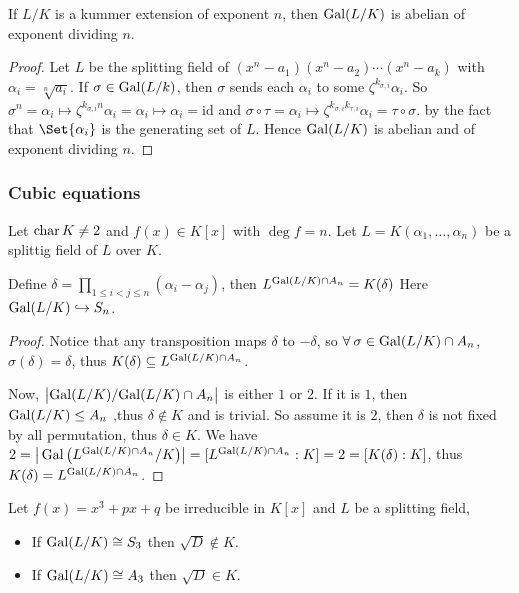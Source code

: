 \begin{theorem}
  If $L/K$ is a kummer extension of exponent $n$, then $\operatorname{Gal}(L/K)$ is abelian of exponent dividing $n$.

  \begin{proof}
    Let $L$ be the splitting field of $(x^n - a_1)(x^n - a_2) \dotsm (x^n - a_k)$ with $\alpha_i = \sqrt[n]{a_i}$.
    If $\sigma \in \operatorname{Gal}(L/k)$, then $\sigma$ sends each $\alpha_i$ to some $\zeta^{k_{\sigma, i}} \alpha_i$.
    So $\sigma^n = \alpha_i \mapsto \zeta^{k_{\sigma, i} n} \alpha_i = \alpha_i \mapsto \alpha_i = \mathrm{id}$
    and $\sigma \circ \tau = \alpha_i \mapsto \zeta^{k_{\sigma, i} k_{\tau, i}} \alpha_i = \tau \circ \sigma$.
    by the fact that  $\Set{\alpha_i}$ is the generating set of $L$. Hence $\operatorname{Gal}(L/K)$ is abelian and of
    exponent dividing $n$.
  \end{proof}
\end{theorem}

\subsubsection{Cubic equations}

\begin{lemma}
  Let $\operatorname{char} K \neq 2$ and $f(x) \in K[x]$ with $\deg f = n$. Let $L = K(\alpha_1, \dots, \alpha_n)$ be
  a splittig field of $L$ over $K$.

  Define $\delta = \prod_{1 \leq i < j \leq n} (\alpha_i - \alpha_j)$, then $L^{\operatorname{Gal}(L/K) \cap A_n} = K(\delta)$
  Here $\operatorname{Gal}(L/K) \hookrightarrow S_n$.

  \begin{proof}
    Notice that any transposition maps $\delta$ to $-\delta$, so $\forall \sigma \in \Gal(L/K) \cap A_n$,
    $\sigma(\delta) = \delta$, thus $K(\delta) \subseteq L^{\operatorname{Gal}(L/K) \cap A_n}$.

    Now, $\big| {\operatorname{Gal}(L/K)}/{\operatorname{Gal}(L/K) \cap A_n} \big|$ is either $1$ or $2$.
    If it is $1$, then $\operatorname{Gal}(L/K) \leq A_n$ ,thus $\delta \not\in K$ and is trivial.
    So assume it is $2$, then $\delta$ is not fixed by all permutation, thus $\delta \in K$.
    We have $2 = \big| \operatorname{Gal} \big( L^{\operatorname{Gal}(L/K) \cap A_n}/K \big) \big| = [L^{\operatorname{Gal}(L/K) \cap A_n}: K] = 2
    = [K(\delta): K]$, thus $K(\delta) = L^{\operatorname{Gal}(L/K) \cap A_n}$.
  \end{proof}
\end{lemma}

\begin{prop}
  Let $f(x) = x^3 + px + q$ be irreducible in $K[x]$ and $L$ be a splitting field,
  \begin{itemize}
    \item If $\operatorname{Gal}(L/K) \cong S_3$ then $\sqrt{D} \not\in K$.
    \item If $\operatorname{Gal}(L/K) \cong A_3$ then $\sqrt{D} \in K$.
  \end{itemize}
\end{prop}

